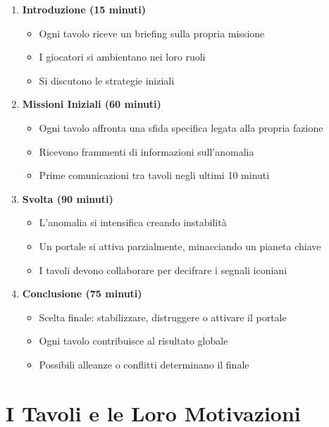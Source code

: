 \documentclass[11pt,a4paper]{article}
\begin{document}
\begin{tcolorbox}[colback=masterlightpurple!10, colframe=masterpurple]
\begin{enumerate}[leftmargin=*]
\item \textbf{Introduzione (15 minuti)}
   \begin{itemize}
   \item Ogni tavolo riceve un briefing sulla propria missione
   \item I giocatori si ambientano nei loro ruoli
   \item Si discutono le strategie iniziali
   \end{itemize}

\item \textbf{Missioni Iniziali (60 minuti)}
   \begin{itemize}
   \item Ogni tavolo affronta una sfida specifica legata alla propria fazione
   \item Ricevono frammenti di informazioni sull'anomalia
   \item Prime comunicazioni tra tavoli negli ultimi 10 minuti
   \end{itemize}

\item \textbf{Svolta (90 minuti)}
   \begin{itemize}
   \item L'anomalia si intensifica creando instabilità
   \item Un portale si attiva parzialmente, minacciando un pianeta chiave
   \item I tavoli devono collaborare per decifrare i segnali iconiani
   \end{itemize}

\item \textbf{Conclusione (75 minuti)}
   \begin{itemize}
   \item Scelta finale: stabilizzare, distruggere o attivare il portale
   \item Ogni tavolo contribuisce al risultato globale
   \item Possibili alleanze o conflitti determinano il finale
   \end{itemize}
\end{enumerate}
\end{tcolorbox}

\section{I Tavoli e le Loro Motivazioni}
\end{document}
